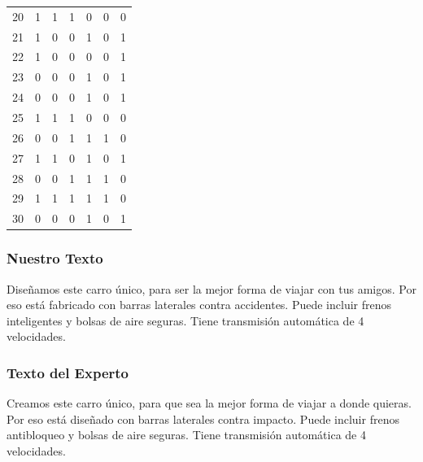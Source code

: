 \begin{table}
\begin{tabular}{|r|c|c|c|c|c|c|}
20 &         1 &         1 &         1 &         0 &         0 &         0 \\
21 &         1 &         0 &         0 &         1 &         0 &         1 \\
22 &         1 &         0 &         0 &         0 &         0 &         1 \\
23 &         0 &         0 &         0 &         1 &         0 &         1 \\
24 &         0 &         0 &         0 &         1 &         0 &         1 \\
25 &         1 &         1 &         1 &         0 &         0 &         0 \\
26 &         0 &         0 &         1 &         1 &         1 &         0 \\
27 &         1 &         1 &         0 &         1 &         0 &         1 \\
28 &         0 &         0 &         1 &         1 &         1 &         0 \\
29 &         1 &         1 &         1 &         1 &         1 &         0 \\
30 &         0 &         0 &         0 &         1 &         0 &         1 

\end{tabular}
\end{table}



\subsubsection{Nuestro Texto}

Diseñamos este carro único, para ser la mejor forma de viajar con tus amigos. Por eso está fabricado con barras laterales contra accidentes. Puede incluir frenos inteligentes y bolsas de aire seguras. Tiene transmisión automática de 4 velocidades.

\subsubsection{Texto del Experto}

Creamos este carro único, para que sea la mejor forma de viajar a donde quieras. Por eso está diseñado con barras laterales contra impacto. Puede incluir frenos antibloqueo y bolsas de aire seguras. Tiene transmisión automática de 4 velocidades.

